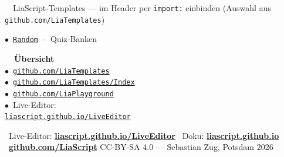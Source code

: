 \documentclass[a4paper,landscape,9pt]{extarticle}
\begin{document}
\begin{liainfo}{\faPuzzlePiece~~LiaScript-Templates — im Header per \texttt{import:} einbinden (Auswahl aus \texttt{github.com/LiaTemplates})}
\begin{minipage}[t]{0.24\linewidth}
$\bullet$~\href{https://github.com/LiaTemplates/Random}{\texttt{Random}}~–~Quiz-Banken
\end{minipage}\hfill
\begin{minipage}[t]{0.24\linewidth}
\textbf{\color{liagreen}\faGithub~~Übersicht}\\[1pt]
$\bullet$~\href{https://github.com/LiaTemplates}{\texttt{github.com/LiaTemplates}}\\
$\bullet$~\href{https://github.com/LiaTemplates/Index}{\texttt{github.com/LiaTemplates/Index}}\\
$\bullet$~\href{https://github.com/LiaPlayground}{\texttt{github.com/LiaPlayground}}\\
$\bullet$~Live-Editor:\\
\hspace*{0.6em}\href{https://liascript.github.io/LiveEditor/}{\texttt{liascript.github.io/LiveEditor}}
\end{minipage}
\end{liainfo}

\vspace{4pt}
{\sffamily\scriptsize\color{muted}
\faInfoCircle~Live-Editor: \href{https://liascript.github.io/LiveEditor/}{\textbf{liascript.github.io/LiveEditor}}\hfill
\faBook~Doku: \href{https://liascript.github.io}{\textbf{liascript.github.io}}\hfill
\faGithub~\href{https://github.com/LiaScript}{\textbf{github.com/LiaScript}} \quad
CC-BY-SA 4.0 — Sebastian Zug, Potsdam 2026}
\end{document}

